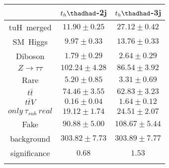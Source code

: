 
\centering
\begin{tabular}{ccc} \toprule\toprule
 & $t_{h}\thadhad$-2j & $t_{h}\thadhad$-3j\\\midrule
tuH~merged & $11.90\pm0.25$ & $27.12\pm0.42$\\
SM~Higgs & $9.97\pm0.33$ & $13.76\pm0.33$\\
Diboson & $1.79\pm0.29$ & $2.64\pm0.29$\\
$Z\to\tau\tau$ & $102.24\pm4.28$ & $86.54\pm3.92$\\
Rare & $5.20\pm0.85$ & $3.31\pm0.69$\\
$t\bar{t}$ & $74.46\pm3.55$ & $62.83\pm3.23$\\
$t\bar{t}V$ & $0.16\pm0.04$ & $1.64\pm0.12$\\
$only~\tau_{sub}~real$ & $19.12\pm1.74$ & $24.51\pm2.07$\\
Fake & $90.88\pm5.00$ & $108.67\pm5.44$\\
background & $303.82\pm7.73$ & $303.89\pm7.77$\\
significance & $0.68$ & $1.53$\\
\bottomrule\bottomrule\\
\end{tabular}

